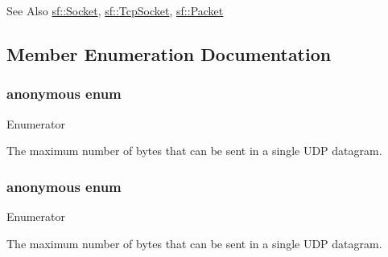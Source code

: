 \begin{DoxySeeAlso}{See Also}
\hyperlink{classsf_1_1_socket}{sf\-::\-Socket}, \hyperlink{classsf_1_1_tcp_socket}{sf\-::\-Tcp\-Socket}, \hyperlink{classsf_1_1_packet}{sf\-::\-Packet} 
\end{DoxySeeAlso}


\subsection{Member Enumeration Documentation}
\hypertarget{classsf_1_1_udp_socket_a589aae95d5f58edde6342af1d1bb940c}{\subsubsection[{anonymous enum}]{\setlength{\rightskip}{0pt plus 5cm}anonymous enum}}\label{classsf_1_1_udp_socket_a589aae95d5f58edde6342af1d1bb940c}
\begin{Desc}
\item[Enumerator]\par
\begin{description}
\item[{\em 
\hypertarget{classsf_1_1_udp_socket_a589aae95d5f58edde6342af1d1bb940ca85c89bc58b797626b7211c06eb78e6b5}{Max\-Datagram\-Size}\label{classsf_1_1_udp_socket_a589aae95d5f58edde6342af1d1bb940ca85c89bc58b797626b7211c06eb78e6b5}
}]The maximum number of bytes that can be sent in a single U\-D\-P datagram. \end{description}
\end{Desc}
\hypertarget{classsf_1_1_udp_socket_a96dbb7f82fdb86302ea2b9ce8e49019e}{\subsubsection[{anonymous enum}]{\setlength{\rightskip}{0pt plus 5cm}anonymous enum}}\label{classsf_1_1_udp_socket_a96dbb7f82fdb86302ea2b9ce8e49019e}
\begin{Desc}
\item[Enumerator]\par
\begin{description}
\item[{\em 
\hypertarget{classsf_1_1_udp_socket_a589aae95d5f58edde6342af1d1bb940ca85c89bc58b797626b7211c06eb78e6b5}{Max\-Datagram\-Size}\label{classsf_1_1_udp_socket_a589aae95d5f58edde6342af1d1bb940ca85c89bc58b797626b7211c06eb78e6b5}
}]The maximum number of bytes that can be sent in a single U\-D\-P datagram. \end{description}
\end{Desc}


